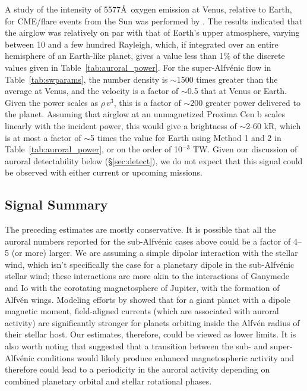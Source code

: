 \documentclass{emulateapj}
\begin{document}
A study of the intensity of 5577\AA\ oxygen emission at Venus, relative to Earth, for CME/flare events from the Sun was performed by \citet{Gray2014}. The results indicated that the airglow was relatively on par with that of Earth's upper atmosphere, varying between 10 and a few hundred Rayleigh, which, if integrated over an entire hemisphere of an Earth-like planet, gives a value less than 1\% of the discrete values given in Table~\ref{tab:auroral_power}. For the super-Alfv\'{e}nic flow in Table~\ref{tab:swparams}, the number density is $\sim$1500 times greater than the average at Venus, and the velocity is a factor of $\sim$0.5 that at Venus or Earth. Given the power scales as $\rho\,v^3$, this is a factor of $\sim$200 greater power delivered to the planet. Assuming that airglow at an unmagnetized Proxima Cen b scales linearly with the incident power, this would give a brightness of $\sim$2-60 kR, which is at most a factor of $\sim$5 times the value for Earth using Method 1 and 2 in Table~\ref{tab:auroral_power}, or on the order of 10$^{-3}$ TW.  Given our discussion of auroral detectability below (\S\ref{sec:detect}), we do not expect that this signal could be observed with either current or upcoming missions.

\subsection{Signal Summary}
\label{sec:signal_summary}

The preceding estimates are mostly conservative.  It is possible that all the auroral numbers reported for the sub-Alfv\'{e}nic cases above could be a factor of 4--5 (or more) larger. We are assuming a simple dipolar interaction with the stellar wind, which isn't specifically the case for a planetary dipole in the sub-Alfv\'{e}nic stellar wind; these interactions are more akin to the interactions of Ganymede and Io with the corotating magnetosphere of Jupiter, with the formation of Alfv\'{e}n wings. Modeling efforts by \citet{Preusse2007} showed that for a giant planet with a dipole magnetic moment, field-aligned currents (which are associated with auroral activity) are significantly stronger for planets orbiting inside the Alfv\'{e}n radius of their stellar host. Our estimates, therefore, could be viewed as lower limits. It is also worth noting that \citet{Cohen2014} suggested that a transition between the sub- and super-Alfv\'{e}nic conditions would likely produce enhanced magnetospheric activity and therefore could lead to a periodicity in the auroral activity depending on combined planetary orbital and stellar rotational phases. 
 
\end{document}
